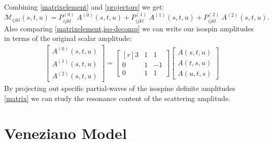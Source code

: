 \documentclass[aps,prd,amsmath,amssymb,superscriptaddress,onecolumn,
nofootinbib,showpacs,preprintnumbers]{revtex4-1}
\begin{document}
Combining \cref{matrixelement} and \cref{projectors} we get:
%
	\begin{equation}\label{iso-decomp}
	\mathcal{M}_{ijkl}(s,t,u) = P^{(0)}_{ijkl} \; A^{(0)}(s,t,u) + P^{(1)}_{ijkl}  \; A^{(1)}(s,t,u) +  P^{(2)}_{ijkl} \; A^{(2)}(s,t,u).
	\end{equation}
%
Also comparing \cref{matrixelement,iso-decomp} we can write our isospin amplitudes in terms of the original scalar amplitude: 
%
	\begin{align} \label{matrix}
		\begin{bmatrix} 
		A^{(0)}(s,t,u) \\ A^{(1)} (s,t,u) \\ A^{(2)}(s,t,u)
		\end{bmatrix} 
	=
		\begin{bmatrix*}[r]
			3 & 1 & 1 \\ 	0 & 1 & -1 \\ 0 & 1 & 1 
		\end{bmatrix*}
		\begin{bmatrix}
		A(s,t,u) \\ A(t,s,u) \\ A(u,t,s) 
		\end{bmatrix}
	\end{align}
%
By projecting out specific partial-waves of the isospine definite amplitudes \cref{matrix} we can study the resonance content of the scattering amplitude.

\section{Veneziano Model}
\end{document}
